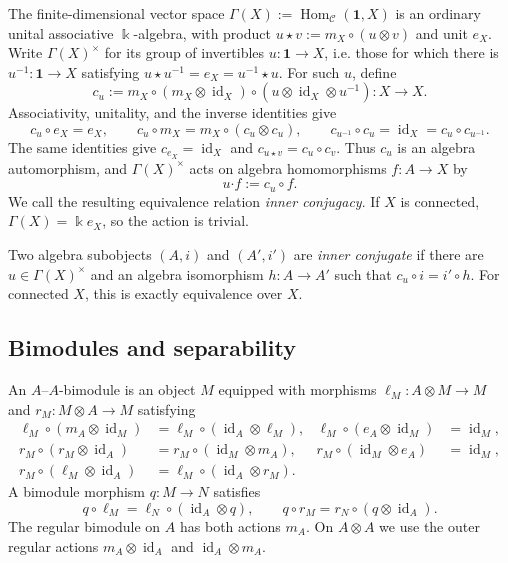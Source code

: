 \documentclass[11pt]{amsart}
\theoremstyle{definition}
\theoremstyle{remark}
\newcommand{\C}{\mathcal C}
\newcommand{\one}{\mathbf 1}
\newcommand{\kk}{\Bbbk}
\DeclareMathOperator{\Hom}{Hom}
\DeclareMathOperator{\id}{id}
\begin{document}
The finite-dimensional vector space
$\Gamma(X):=\Hom_{\C}(\one,X)$ is an ordinary unital associative
$\kk$-algebra, with product
$u\star v:=m_X\circ(u\otimes v)$ and unit $e_X$.  Write
$\Gamma(X)^\times$ for its group of invertibles $u:\one\to X$, i.e. those
for which there is $u^{-1}:\one\to X$ satisfying
$u\star u^{-1}=e_X=u^{-1}\star u$.
For such $u$, define
\begin{equation}\label{eq:categorical-conjugation}
 c_u:=m_X\circ(m_X\otimes\id_X)
 \circ(u\otimes\id_X\otimes u^{-1}):X\longrightarrow X.
\end{equation}
Associativity, unitality, and the inverse identities give
\[
 c_u\circ e_X=e_X,\qquad
 c_u\circ m_X=m_X\circ(c_u\otimes c_u),\qquad
 c_{u^{-1}}\circ c_u=\id_X=c_u\circ c_{u^{-1}}.
\]
The same identities give
$c_{e_X}=\id_X$ and $c_{u\star v}=c_u\circ c_v$.
Thus $c_u$ is an algebra automorphism, and $\Gamma(X)^\times$ acts on
algebra homomorphisms $f:A\to X$ by
\begin{equation}\label{eq:conjugation-action}
 u\boldsymbol\cdot f:=c_u\circ f.
\end{equation}
We call the resulting equivalence relation \emph{inner conjugacy}.  If $X$
is connected, $\Gamma(X)=\kk e_X$, so the action is trivial.

Two algebra subobjects $(A,i)$ and $(A',i')$ are \emph{inner conjugate} if
there are $u\in\Gamma(X)^\times$ and an algebra isomorphism $h:A\to A'$ such
that $c_u\circ i=i'\circ h$.  For connected $X$, this is exactly equivalence
over $X$.

\subsection{Bimodules and separability}\label{subsec:bimodule-separability}

An $A$--$A$-bimodule is an object $M$ equipped with morphisms
$\ell_M:A\otimes M\to M$ and $r_M:M\otimes A\to M$ satisfying
\begin{align*}
 \ell_M\circ(m_A\otimes\id_M)
   &=\ell_M\circ(\id_A\otimes\ell_M),&
 \ell_M\circ(e_A\otimes\id_M)&=\id_M,\\
 r_M\circ(r_M\otimes\id_A)
   &=r_M\circ(\id_M\otimes m_A),&
 r_M\circ(\id_M\otimes e_A)&=\id_M,\\
 r_M\circ(\ell_M\otimes\id_A)
   &=\ell_M\circ(\id_A\otimes r_M).
\end{align*}
A bimodule morphism $q:M\to N$ satisfies
\[
 q\circ\ell_M=\ell_N\circ(\id_A\otimes q),
 \qquad
 q\circ r_M=r_N\circ(q\otimes\id_A).
\]
The regular bimodule on $A$ has both actions $m_A$.  On $A\otimes A$ we use
the outer regular actions $m_A\otimes\id_A$ and
$\id_A\otimes m_A$.
\end{document}
